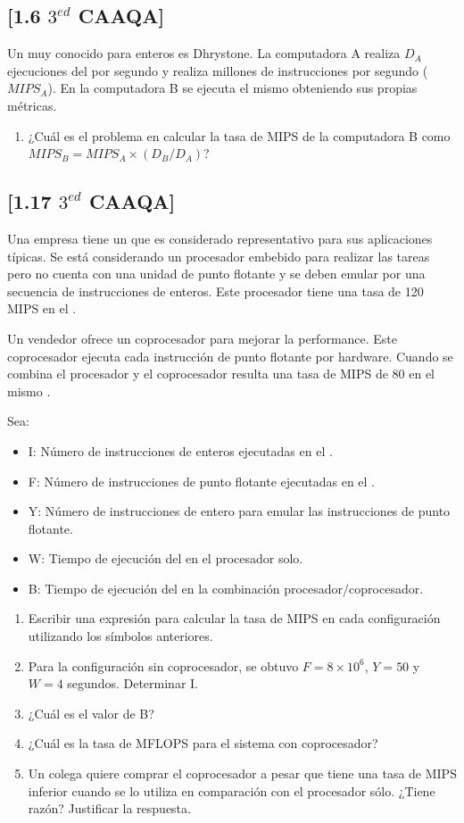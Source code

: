 \subsection{[1.6 $3^{ed}$ CAAQA]}
Un \BMRK muy conocido para enteros es Dhrystone. La computadora A realiza $D_A$ ejecuciones del \BMRK por segundo y realiza millones de instrucciones por segundo ($MIPS_A$). En la computadora B se ejecuta el mismo \BMRK obteniendo sus propias métricas.

\begin{enumerate}
 \item ¿Cuál es el problema en calcular la tasa de MIPS de la computadora B como $MIPS_B = MIPS_A \times (D_B / D_A )$?
\end{enumerate}



\subsection{[1.17 $3^{ed}$ CAAQA]}
Una empresa tiene un \BMRK que es considerado representativo para sus aplicaciones típicas. Se está considerando un procesador embebido para realizar las tareas pero no cuenta con una unidad de punto flotante y se deben emular por una secuencia de instrucciones de enteros. Este procesador tiene una tasa de 120 MIPS en el \BMRK.

Un vendedor ofrece un coprocesador para mejorar la performance. Este coprocesador ejecuta cada instrucción de punto flotante por hardware. Cuando se combina el procesador y el coprocesador resulta una tasa de MIPS de 80 en el mismo \BMRK.

Sea:

\begin{itemize}
 \item I: Número de instrucciones de enteros ejecutadas en el \BMRK.
 \item F: Número de instrucciones de punto flotante ejecutadas en el \BMRK.
 \item Y: Número de instrucciones de entero para emular las instrucciones de punto flotante.
 \item W: Tiempo de ejecución del \BMRK en el procesador solo.
 \item B: Tiempo de ejecución del \BMRK en la combinación procesador/coprocesador.
\end{itemize}

\begin{enumerate}
 \item Escribir una expresión para calcular la tasa de MIPS en cada configuración utilizando los símbolos anteriores.
 \item Para la configuración sin coprocesador, se obtuvo $F = 8 \times 10^6$, $Y = 50$ y $W = 4$ segundos. Determinar I.
 \item ¿Cuál es el valor de B?
 \item ¿Cuál es la tasa de MFLOPS para el sistema con coprocesador?
 \item Un colega quiere comprar el coprocesador a pesar que tiene una tasa de MIPS inferior cuando se lo utiliza en comparación con el procesador sólo. ¿Tiene razón? Justificar la respuesta.
\end{enumerate}


